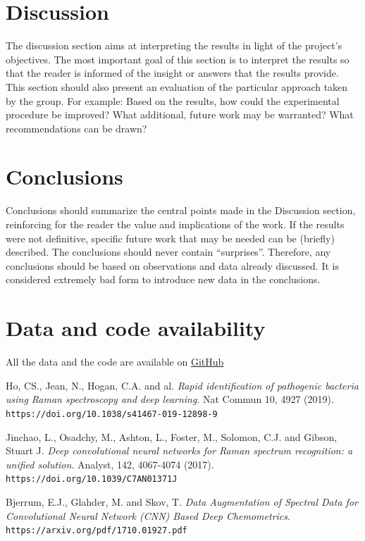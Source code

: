 \section{Discussion}
The discussion section aims at interpreting the results in light of the project's objectives. The most important goal of this section is to interpret the results so that the reader is informed of the insight or answers that the results provide. This section should also present an evaluation of the particular approach taken by the group. For example: Based on the results, how could the experimental procedure be improved? What additional, future work may be warranted? What recommendations can be drawn?


\section{Conclusions}
Conclusions should summarize the central points made in the Discussion section, reinforcing for the reader the value and implications of the work. If the results were not definitive, specific future work that may be needed can be (briefly) described. The conclusions should never contain ``surprises''. Therefore, any conclusions should be based on observations and data already discussed. It is considered extremely bad form to introduce new data in the conclusions.

\section{Data and code availability}
All the data and the code are available on \href{https://github.com/nsgln/Deep-Learning-Raman-Spectroscopy}{GitHub}

\begin{thebibliography}{9}
Ho, CS., Jean, N., Hogan, C.A. and al.
\textit{Rapid identification of pathogenic bacteria using Raman spectroscopy and deep learning}. 
Nat Commun 10, 4927 (2019).
\\\texttt{https://doi.org/10.1038/s41467-019-12898-9}

Jinchao, L., Osadchy, M., Ashton, L., Foster, M., Solomon, C.J. and Gibson, Stuart J.
\textit{Deep convolutional neural networks for Raman spectrum recognition: a unified solution}.
Analyst, 142, 4067-4074 (2017).
\\\texttt{https://doi.org/10.1039/C7AN01371J}

Bjerrum, E.J., Glahder, M. and Skov, T.
\textit{Data Augmentation of Spectral Data for Convolutional Neural Network (CNN) Based Deep Chemometrics}.
\\\texttt{https://arxiv.org/pdf/1710.01927.pdf}
\end{thebibliography}

